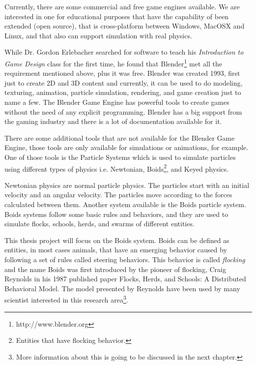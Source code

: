 
Currently, there are some commercial and free game engines available. We are interested in one for educational purposes that have the capability of been extended (open source), that is cross-platform between Windows, MacOSX and Linux, and that also can support simulation with real physics. 


While Dr. Gordon Erlebacher searched for software to teach his \textit{Introduction to Game Design} class for the first time, he found that Blender\footnote{http://www.blender.org} met all the requirement mentioned above, plus it was free. Blender was created 1993, first just to create 2D and 3D content and currently, it can be used to do modeling, texturing, animation, particle simulation, rendering, and game creation just to name a few. The Blender Game Engine has powerful tools to create games without the need of any explicit programming. Blender has a big support from the gaming industry and there is a lot of documentation available for it.  


There are some additional tools that are not available for the Blender Game Engine, those tools are only available for simulations or animations, for example. One of those tools is the Particle Systems which is used to simulate particles using different types of physics i.e. Newtonian, Boids\footnote{Entities that have flocking behavior.}, and Keyed physics. 



Newtonian physics are normal particle physics. The particles start with an initial velocity and an angular velocity.  The particles move according to the forces calculated between them. Another system available is the Boids particle system. Boids systems follow some basic rules and behaviors, and they are used to simulate flocks, schools, herds, and swarms of different entities.

This thesis project will focus on the Boids system. Boids can be defined as entities, in most cases animals, that have an emerging behavior caused by following a set of rules called steering behaviors. This behavior is called \textit{flocking} and the name Boids was first introduced by the pioneer of flocking, Craig Reynolds in his 1987 published paper Flocks, Herds, and Schools: A Distributed Behavioral Model\cite{craig1}. The model presented by Reynolds have been used by many scientist interested in this research area\footnote{More information about this is going to be discussed in the next chapter.}.

